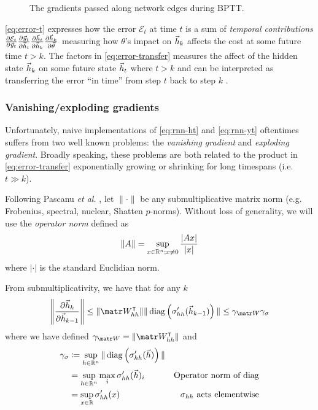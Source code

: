 \documentclass[dissertation.tex]{subfiles}
\begin{document}
\begin{figure}[htpb]
    \centering
    
    \caption{The gradients passed along network edges during BPTT.}
    \label{fig:rnn-bptt}
\end{figure}

\autoref{eq:error-t} expresses how the error $\mathcal{E}_t$ at time $t$ is a sum
of \emph{temporal contributions} $
\frac{\partial \mathcal{E}_t}{\partial \vec{y}_t}
\frac{\partial \vec{y}_t}{\partial \vec{h}_t}
\frac{\partial \vec{h}_t}{\partial \vec{h}_k}
\frac{\partial \vec{h}_k}{\partial \vec{\theta}}$
measuring how $\theta$'s impact on $\vec{h}_k$ affects the cost at some future
time $t > k$. The factors in \autoref{eq:error-transfer} measures the affect
of the hidden state $\vec{h}_k$ on some future state $\vec{h}_t$ where $t > k$
and can be interpreted as transferring the error ``in time'' from step $t$ back
to step $k$ \cite{Pascanu2012}.

\subsubsection{Vanishing/exploding gradients}

Unfortunately, naive implementations of \autoref{eq:rnn-ht} and
\autoref{eq:rnn-yt} oftentimes suffers from two well known problems: the
\emph{vanishing gradient} and \emph{exploding gradient}\cite{Bengio1994}.
Broadly speaking, these problems are both related to the product in
\autoref{eq:error-transfer} exponentially growing or shrinking for long
timespans (i.e. $t \gg k$).

Following Pascanu \textit{et al.} \cite{Pascanu2012}, let $\| \cdot \|$ be any
submultiplicative matrix norm (e.g. Frobenius, spectral, nuclear, Shatten
$p$-norms). Without loss of generality, we will use the \emph{operator norm}
defined as
\begin{equation}
    \| A \| = \sup_{x \in \mathbb{R}^n; x \neq 0} \frac{|A x|}{|x|}
\end{equation}
where $|\cdot|$ is the standard Euclidian norm.

From submultiplicativity, we have that for any $k$
\begin{equation}
    \left\| \frac{\pd \h_k}{\pd \h_{k-1}} \right\|
    \leq \| \W_{hh}^\tp \| \| \diag\left( \sigma_{hh}'(\h_{k-1}) \right) \|
    \leq \gamma_{\W} \gamma_\sigma
\end{equation}
where we have defined $\gamma_{\W} = \| \W_{hh}^\tp \|$ and
\begin{align}
    \gamma_\sigma
    &\coloneqq \sup_{h \in \mathbb{R}^n} \| \operatorname*{diag} \left( \sigma_{hh}'(\vec{h}) \right) \|  &\\
    &= \sup_{h \in \mathbb{R}^n} \max_i \sigma_{hh}'(\vec{h})_i &\mbox{Operator norm of diag} \\
    &= \sup_{x \in \mathbb{R}} \sigma_{hh}'(x) &\mbox{$\sigma_{hh}$ acts elementwise}
\end{align}
\end{document}

